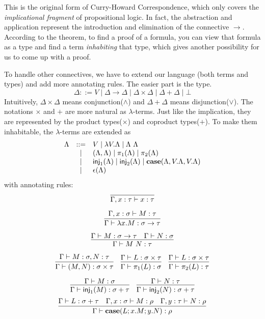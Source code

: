 This is the original form of Curry-Howard Correspondence, which only
covers the {\it implicational fragment} of propositional logic. In fact,
the abstraction and application represent the introduction and elimination
of the connective $\to$. According to the theorem, to find a proof of a
formula, you can view that formula as a type and find a term {\it inhabiting}
that type, which gives another possibility for us to come up with a proof.

To handle other connectives, we have to extend our language (both terms 
and types) and add more annotating rules. The easier part is the type.
$$
\Delta ::= V\mid\Delta\to\Delta\mid\Delta\times\Delta\mid\Delta+\Delta\mid\bot
$$
Intuitively, $\Delta\times\Delta$ means conjunction($\wedge$) and
$\Delta+\Delta$ means disjunction($\vee$). The notations $\times$ and
$+$ are more natural as $\lambda$-terms. Just like the implication,
they are represented by the product types($\times$) and coproduct 
types($+$). To make them inhabitable, the $\lambda$-terms are extended
as
\newcommand{\inj}{\name{inj}}
$$
\begin{array}{rcl}
    \Lambda &::=& V \mid \lambda V.\Lambda \mid \Lambda\ \Lambda \\
            &\mid& (\Lambda, \Lambda) \mid \pi_1(\Lambda) \mid \pi_2(\Lambda)\\
            &\mid& \inj_1(\Lambda) \mid \inj_2(\Lambda) \mid {\bf case}(\Lambda,V.\Lambda,V.\Lambda) \\
            &\mid& \epsilon(\Lambda)
\end{array}
$$
with annotating rules:
$$\infer{\Gamma, x:\tau\proves x:\tau}{}$$

$$\infer{\Gamma\proves\lambda x.M:\sigma\to\tau}{\Gamma,x:\sigma\proves M:\tau}$$

$$\infer{\Gamma\proves M\ N:\tau}{\Gamma\proves M:\sigma\to\tau & \Gamma\proves N:\sigma}$$

$$
\infer{\Gamma\proves (M, N): \sigma\times\tau}{\Gamma\proves M:\sigma, N:\tau}
\ \ \ 
\infer{\Gamma\proves \pi_1(L):\sigma}{\Gamma\proves L: \sigma\times\tau}
\ \ \ 
\infer{\Gamma\proves \pi_2(L):\tau}{\Gamma\proves L: \sigma\times\tau}
$$

$$
\infer{\Gamma\proves \inj_1(M):\sigma + \tau}{\Gamma\proves M:\sigma}
\ \ \ 
\infer{\Gamma\proves \inj_2(N):\sigma + \tau}{\Gamma\proves N:\tau}
$$
$$
\infer{\Gamma\proves \text{\bf case}(L;x.M;y.N): \rho}{
    \Gamma\proves L:\sigma+\tau &
    \Gamma, x:\sigma\proves M:\rho &
    \Gamma, y:\tau\proves N:\rho
}
$$

